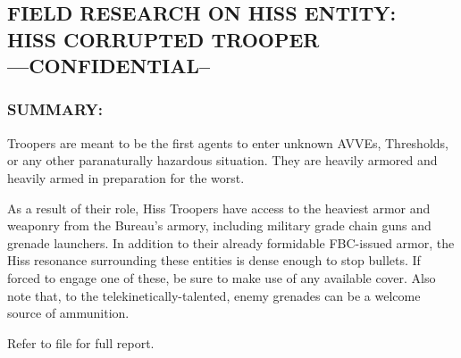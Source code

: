 \subsection*{FIELD RESEARCH ON HISS ENTITY:\\
	HISS CORRUPTED TROOPER\\
	—CONFIDENTIAL--}
\subsubsection*{SUMMARY:}

\par Troopers are meant to be the first agents
to enter unknown AVVEs, Thresholds, or
any other paranaturally hazardous
situation. They are heavily armored and
heavily armed in preparation for the
worst.
\par As a result of their role, Hiss Troopers have access to the
heaviest armor and weaponry from the Bureau's armory, including
military grade chain guns and grenade launchers. In addition to
their already formidable FBC-issued armor, the Hiss resonance
surrounding these entities is dense enough to stop bullets. If
forced to engage one of these, be sure to make use of any
available cover. Also note that, to the telekinetically-talented,
enemy grenades can be a welcome source of ammunition.
\par Refer to file  for full report.